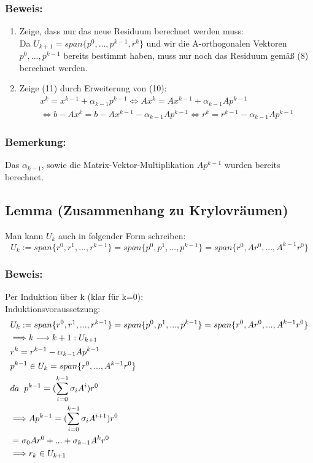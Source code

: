 \documentclass{article}
\begin{document}
\subsubsection{Beweis:}
\begin{enumerate}
\item Zeige, dass nur das neue Residuum berechnet werden muss:
\\Da $U_{k+1} = span\{p^{0},...,p^{k-1},r^{k}\}$ und wir die A-orthogonalen Vektoren $p^{0},...,p^{k-1}$ bereits bestimmt haben, muss nur noch das Residuum gemäß (8) berechnet werden.
\item Zeige (11) durch Erweiterung von (10):
\begin{equation*}
\begin{split}
x^{k} = x^{k-1} + \alpha_{k-1}p^{k-1}
\Longleftrightarrow Ax^{k} = Ax^{k-1} + \alpha_{k-1}Ap^{k-1}\\
\Longleftrightarrow b - Ax^{k} = b - Ax^{k-1} - \alpha_{k-1}Ap^{k-1}
\Longleftrightarrow r^{k} = r^{k-1} - \alpha_{k-1}Ap^{k-1}
\end{split}
\end{equation*}
\end{enumerate}

\subsubsection{Bemerkung:}
Das $\alpha_{k-1}$, sowie die Matrix-Vektor-Multiplikation $Ap^{k-1}$ wurden bereits berechnet.

\subsection{Lemma (Zusammenhang zu Krylovräumen)}
Man kann $U_{k}$ auch in folgender Form schreiben:
\begin{equation}
U_{k} := span\{r^{0}, r^{1},...,r^{k-1}\} = span\{p^{0},p^{1},...,p^{k-1}\} = span\{r^{0}, Ar^{0},...,A^{k-1}r^{0}\}
\end{equation}

\subsubsection{Beweis:}
Per Induktion über k (klar für k=0):
\\Induktionsvoraussetzung:
\begin{align*}
& U_{k} := span\{r^{0}, r^{1},...,r^{k-1}\} = span\{p^{0},p^{1},...,p^{k-1}\} = span\{r^{0}, Ar^{0},...,A^{k-1}r^{0}\}\\
& \Longrightarrow k \longrightarrow k+1: U_{k+1}\\
& r^{k} = r^{k-1} - \alpha_{k-1} Ap^{k-1}\\
& p^{k-1} \in U_{k} = span\{r^{0},...,A^{k-1}r^{0}\}\\
& da \hspace{2mm} p^{k-1} = (\sum_{i=0}^{k-1} \sigma_{i}A^{i})r^{0}\\
& \Longrightarrow Ap^{k-1} = (\sum_{i=0}^{k-1} \sigma_{i}A^{i+1})r^{0}\\
& = \sigma_{0}Ar^{0} + ... + \sigma_{k-1}A^{k}r^{0}\\
& \Longrightarrow r_{k} \in U_{k+1}
\end{align*}
\end{document}
